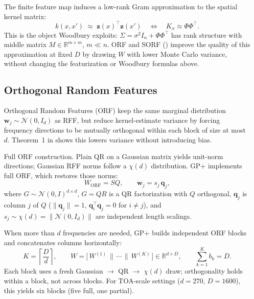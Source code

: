 \documentclass[11pt]{article}
\newcommand{\noise}{\sigma^2}
\newcommand{\Sig}{\Sigma}
\newcommand{\Ph}{\Phi}
\begin{document}
The finite feature map induces a low-rank Gram approximation to the spatial kernel matrix:
\begin{equation}
  \label{eq:rff-kernel}
  k(x, x') \;\approx\; \mathbf z(x)^\top \mathbf z(x')
  \quad\Longleftrightarrow\quad
  K_x \approx \Ph\Ph^\top.
\end{equation}
This is the object Woodbury exploits: $\Sig = \noise I_n + \Ph\Ph^\top$ has rank structure with
middle matrix $M \in \mathbb{R}^{m \times m}$, $m \ll n$.
ORF and SORF () improve the quality of this approximation at
fixed $D$ by drawing $W$ with lower Monte Carlo variance, without changing the featurization or
Woodbury formulas above.


\subsection{Orthogonal Random Features}
\label{sec:progress-orf}

Orthogonal Random Features (ORF) \citep{yu2016orf} keep the same marginal distribution
$\mathbf w_j \sim \mathcal{N}(0, I_d)$ as RFF, but reduce kernel-estimate variance by forcing
frequency directions to be mutually orthogonal within each block of size at most $d$.
Theorem~1 in \citet{yu2016orf} shows this lowers variance without introducing bias.

Full ORF construction.
Plain QR on a Gaussian matrix yields unit-norm directions; Gaussian RFF norms follow a $\chi(d)$
distribution.
GP+ implements full ORF, which restores those norms:
\begin{equation}
  \label{eq:progress-orf}
  W_{\mathrm{ORF}} = S Q,
  \qquad
  \mathbf w_j = s_j\,\mathbf q_j,
\end{equation}
where $G \sim \mathcal{N}(0,I)^{d \times d}$, $G = QR$ is a QR factorization with $Q$ orthogonal,
$\mathbf q_j$ is column $j$ of $Q$ ($\|\mathbf q_j\| = 1$, $\mathbf q_i^\top \mathbf q_j = 0$ for $i \ne j$),
and $s_j \sim \chi(d) = \|\mathcal{N}(0, I_d)\|$ are independent length scalings.

When more than $d$ frequencies are needed, GP+ builds independent ORF blocks and concatenates
columns horizontally:
\begin{equation}
  \label{eq:progress-block-loop}
  K = \left\lceil \frac{D}{d} \right\rceil,
  \qquad
  W = \bigl[\, W^{(1)} \,\|\, \cdots \,\|\, W^{(K)} \,\bigr] \in \mathbb{R}^{d \times D},
  \qquad
  \sum_{k=1}^{K} b_k = D.
\end{equation}
Each block uses a fresh Gaussian $\to$ QR $\to$ $\chi(d)$ draw; orthogonality holds within a block,
not across blocks.
For TOA-scale settings ($d = 270$, $D = 1600$), this yields six blocks (five full, one partial).
\end{document}
